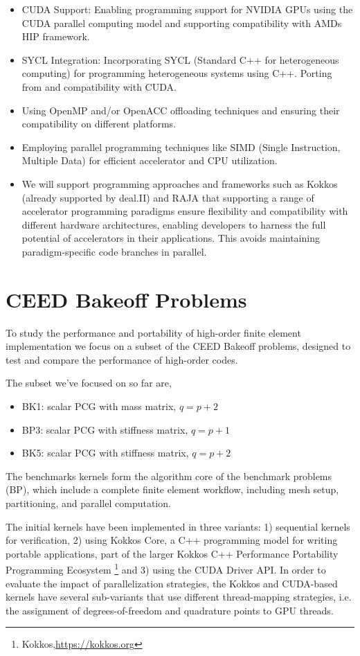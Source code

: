 \documentclass[a4paper,12pt]{article}
\begin{document}
\begin{itemize}
\item CUDA Support: Enabling programming support for NVIDIA GPUs using the CUDA parallel computing model and
supporting compatibility with AMDs HIP framework.
\item SYCL Integration: Incorporating SYCL (Standard C++ for heterogeneous computing) for programming heterogeneous
systems using C++. Porting from and compatibility with CUDA.
\item Using OpenMP and/or OpenACC offloading techniques and ensuring their compatibility on different
platforms.
\item Employing parallel programming techniques like SIMD (Single Instruction, Multiple Data) for efficient accelerator
and CPU utilization.
\item We will support programming approaches and frameworks such as Kokkos (already supported by deal.II) and RAJA
that supporting a range of accelerator programming paradigms ensure flexibility and compatibility with different
hardware architectures, enabling developers to harness the full potential of accelerators in their applications. This avoids maintaining paradigm-specific code branches in parallel.
\end{itemize}

\newpage

\section{CEED Bakeoff Problems}

To study the performance and portability of high-order finite element implementation we focus on a subset of the CEED Bakeoff problems, designed to test and compare
the performance of high-order codes.

The subset we've focused on so far are,
\begin{itemize}
    \item BK1: scalar PCG with mass matrix, $q = p+2$
    \item BP3: scalar PCG with stiffness matrix, $q = p+1$
    \item BK5: scalar PCG with stiffness matrix, $q = p+2$
\end{itemize}
The benchmarks kernels form the algorithm core of the benchmark problems (BP), which include a complete finite element workflow, including mesh setup, partitioning, and parallel computation.

The initial kernels have been implemented in three variants: 1) sequential kernels for verification, 2) using Kokkos Core, a C++ programming model for writing portable applications, part of the larger Kokkos C++ Performance Portability Programming Ecosystem \footnote{Kokkos,\url{https://kokkos.org}} and 3) using the CUDA Driver API. In order to evaluate the impact of parallelization strategies, the Kokkos and CUDA-based kernels have several sub-variants that use different thread-mapping strategies, i.e. the assignment of degrees-of-freedom and quadrature points to GPU threads.
\end{document}

